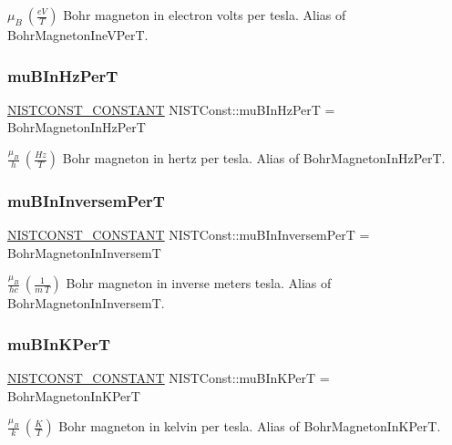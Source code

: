 $\mu_B \ (\frac{eV}{T})$ Bohr magneton in electron volts per tesla. Alias of Bohr\+Magneton\+Ine\+V\+PerT. \mbox{\label{group___n_i_s_t_const-_bohr_magneton_ga034678e5623f2ac3e279bddd75441ba3}} 
\subsubsection{\texorpdfstring{mu\+B\+In\+Hz\+PerT}{muBInHzPerT}}
{\footnotesize\ttfamily \mbox{\hyperlink{group___n_i_s_t_const-_macros_ga2b0fc1d7452373f816175dd86ce26729}{N\+I\+S\+T\+C\+O\+N\+S\+T\+\_\+\+C\+O\+N\+S\+T\+A\+NT}} N\+I\+S\+T\+Const\+::mu\+B\+In\+Hz\+PerT = Bohr\+Magneton\+In\+Hz\+PerT}

$\frac{\mu_B}{h} \ (\frac{Hz}{T})$ Bohr magneton in hertz per tesla. Alias of Bohr\+Magneton\+In\+Hz\+PerT. \mbox{\label{group___n_i_s_t_const-_bohr_magneton_ga6da84d6557bbc4d5af7411fae3375bc9}} 
\subsubsection{\texorpdfstring{mu\+B\+In\+Inversem\+PerT}{muBInInversemPerT}}
{\footnotesize\ttfamily \mbox{\hyperlink{group___n_i_s_t_const-_macros_ga2b0fc1d7452373f816175dd86ce26729}{N\+I\+S\+T\+C\+O\+N\+S\+T\+\_\+\+C\+O\+N\+S\+T\+A\+NT}} N\+I\+S\+T\+Const\+::mu\+B\+In\+Inversem\+PerT = Bohr\+Magneton\+In\+InversemT}

$\frac{\mu_B}{hc} \ (\frac{1}{m\ T})$ Bohr magneton in inverse meters tesla. Alias of Bohr\+Magneton\+In\+InversemT. \mbox{\label{group___n_i_s_t_const-_bohr_magneton_gafaf9e1dcc714551e3affd46bd94a81e1}} 
\subsubsection{\texorpdfstring{mu\+B\+In\+K\+PerT}{muBInKPerT}}
{\footnotesize\ttfamily \mbox{\hyperlink{group___n_i_s_t_const-_macros_ga2b0fc1d7452373f816175dd86ce26729}{N\+I\+S\+T\+C\+O\+N\+S\+T\+\_\+\+C\+O\+N\+S\+T\+A\+NT}} N\+I\+S\+T\+Const\+::mu\+B\+In\+K\+PerT = Bohr\+Magneton\+In\+K\+PerT}

$\frac{\mu_B}{k} \ (\frac{K}{T})$ Bohr magneton in kelvin per tesla. Alias of Bohr\+Magneton\+In\+K\+PerT. 